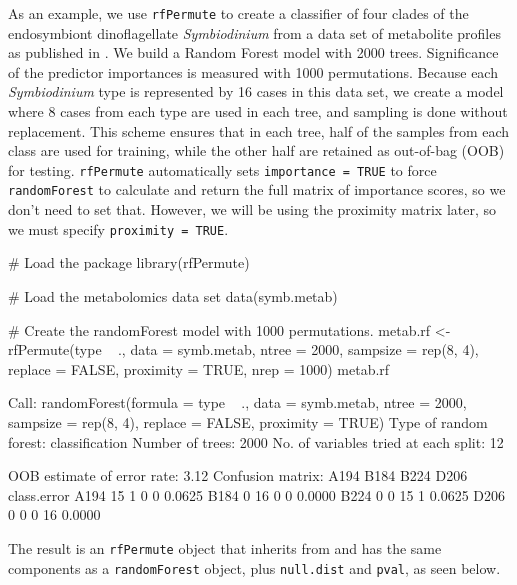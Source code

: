 As an example, we use \texttt{rfPermute} to create a classifier of four
clades of the endosymbiont dinoflagellate \emph{Symbiodinium} from a
data set of metabolite profiles as published in \citet{RN404}. We build
a Random Forest model with 2000 trees. Significance of the predictor
importances is measured with 1000 permutations. Because each
\emph{Symbiodinium} type is represented by 16 cases in this data set, we
create a model where 8 cases from each type are used in each tree, and
sampling is done without replacement. This scheme ensures that in each
tree, half of the samples from each class are used for training, while
the other half are retained as out-of-bag (OOB) for testing.
\texttt{rfPermute} automatically sets \texttt{importance\ =\ TRUE} to
force \texttt{randomForest} to calculate and return the full matrix of
importance scores, so we don't need to set that. However, we will be
using the proximity matrix later, so we must specify
\texttt{proximity\ =\ TRUE}.

\begin{Schunk}
\begin{Sinput}
# Load the package
library(rfPermute)
\end{Sinput}
\end{Schunk}\begin{Schunk}
\begin{Sinput}
# Load the metabolomics data set
data(symb.metab)

# Create the randomForest model with 1000 permutations.
metab.rf <- rfPermute(type ~ ., data = symb.metab, ntree = 2000, sampsize = rep(8, 
    4), replace = FALSE, proximity = TRUE, nrep = 1000)
metab.rf
\end{Sinput}
\begin{Soutput}

Call:
 randomForest(formula = type ~ ., data = symb.metab, ntree = 2000,      sampsize = rep(8, 4), replace = FALSE, proximity = TRUE) 
               Type of random forest: classification
                     Number of trees: 2000
No. of variables tried at each split: 12

        OOB estimate of  error rate: 3.12%
Confusion matrix:
     A194 B184 B224 D206 class.error
A194   15    1    0    0      0.0625
B184    0   16    0    0      0.0000
B224    0    0   15    1      0.0625
D206    0    0    0   16      0.0000
\end{Soutput}
\end{Schunk}

The result is an \texttt{rfPermute} object that inherits from and has
the same components as a \texttt{randomForest} object, plus
\texttt{null.dist} and \texttt{pval}, as seen below.


